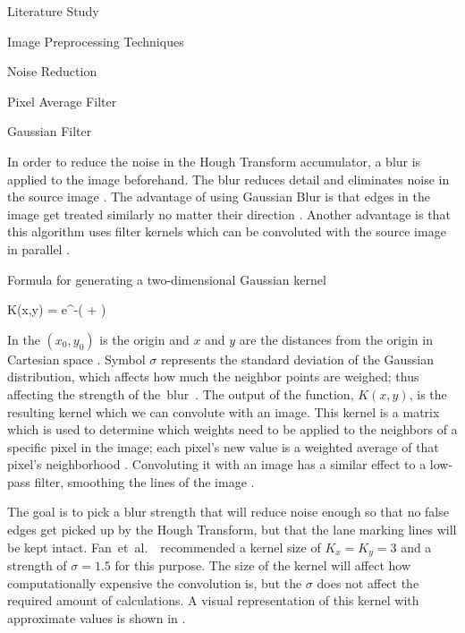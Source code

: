 \documentclass{matthijs}
\begin{document}
\begin{hoofdstuk}{Literature Study}
\begin{paragraaf}{Image Preprocessing Techniques}
\begin{subparagraaf}{Noise Reduction}
\begin{subsubparagraaf}{Pixel Average Filter}
				\end{subsubparagraaf}

				\begin{subsubparagraaf}{Gaussian Filter}

					In order to reduce the noise in the Hough Transform accumulator, a blur is applied to the image beforehand.
					The blur reduces detail and eliminates noise in the source image \cite{fan2016faster}.
					The advantage of using Gaussian Blur is that edges in the image get treated similarly no matter their direction \cite{waltz1998efficient}.
					Another advantage is that this algorithm uses filter kernels which can be convoluted with the source image in parallel \cite{stroem2016parallel}.
					
					\begin{figuur}{Formula for generating a two-dimensional Gaussian kernel}

						\begin{largequation}
							K(x,y) = e^{-( + )}
						\end{largequation}\cite{gedraite2011investigation}
					
					\end{figuur}

					\bigskip

					In  the $ (x_0,y_0) $ is the origin and $x$ and $y$ are the distances from the origin in Cartesian space \cite{gedraite2011investigation}.
					Symbol $\sigma$ represents the standard deviation of the Gaussian distribution, which affects how much the neighbor points are weighed; thus affecting the strength of \mbox{the blur \cite{haddad1991class}.}
					The output of the function, $K(x,y)$, is the resulting kernel which we can convolute with an image.
					This kernel is a matrix which is used to determine which weights need to be applied to the neighbors of a specific pixel in the image; each pixel's new value is a weighted average of that pixel's neighborhood \cite{gedraite2011investigation}.
					Convoluting it with an image has a similar effect to a low-pass filter, smoothing the lines of the image \cite{haddad1991class}\cite{ferreira2010imagej}.

					\bigskip

					The goal is to pick a blur strength that will reduce noise enough so that no false edges get picked up by the Hough Transform, but that the lane marking lines will be kept intact.
					\mbox{Fan et al. \cite{fan2016faster} recommended} a kernel size of $ K_x = K_y = 3 $ and a strength of $ \sigma = 1.5 $ for this purpose.
					The size of the kernel will affect how computationally expensive the convolution is, but the $\sigma$ does not affect the required amount of calculations.
					A visual representation of this kernel with approximate values is shown in .
					

\end{subsubparagraaf}
\end{subparagraaf}
\end{paragraaf}
\end{hoofdstuk}
\end{document}
